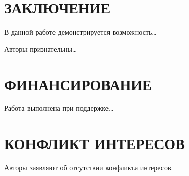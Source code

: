 \documentclass[
 aps, pra,
 amsmath,amssymb,
 11pt,
 final,
tightenlines,
 twoside,
 twocolumn,
 nofloats,
nofootinbib,
 superscriptaddress,
showkeys,
showkeywords,
 ]
{revtex4-2}
\begin{document}
\section{ЗАКЛЮЧЕНИЕ}

В данной работе демонстрируется возможность\ldots


\begin{acknowledgments}
Авторы признательны\ldots
\end{acknowledgments}

\section*{ФИНАНСИРОВАНИЕ}
Работа выполнена при поддержке\ldots

\section*{КОНФЛИКТ ИНТЕРЕСОВ}
Авторы заявляют об отсутствии конфликта интересов.




\end{document}
